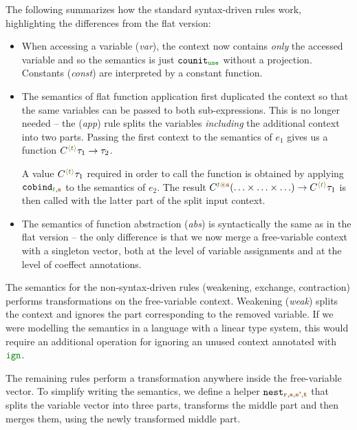 The following summarizes how the standard syntax-driven rules work, highlighting the differences
from the flat version:

\begin{itemize}
\item When accessing a variable (\emph{var}), the context now contains \emph{only} the accessed
  variable and so the semantics is just $\ident{counit}_{\cunit}$ without a projection.
  Constants (\emph{const}) are interpreted by a constant function.

\item The semantics of flat function application first duplicated the context so that the same
  variables can be passed to both sub-expressions. This is no longer needed -- the
  (\emph{app}) rule splits the variables \emph{including} the additional context into two parts.
  Passing the first context to the semantics of $e_1$ gives us a function
  $\ctyp{\alift{\cclrd{t}}}{\tau_1} \rightarrow \tau_2$.

  A value $\ctyp{\alift{\cclrd{t}}}{\tau_1}$ required in order to call the function is obtained by
  applying $\ident{cobind}_{\cclrd{t}, \aclrd{\textbf{s}}}$ to the semantics of $e_2$. The result
  $\ctyp{\cclrd{t}\aseq\aclrd{\textbf{s}}}{(\ldots \times \ldots \times \ldots)} \rightarrow \ctyp{\alift{\cclrd{t}}}{\tau_1}$
  is then called with the latter part of the split input context.

\item The semantics of function abstraction (\emph{abs}) is syntactically the same as in the
  flat version -- the only difference is that we now merge a free-variable context with a
  singleton vector, both at the level of variable assignments and at the level of coeffect
  annotations.
\end{itemize}

\noindent
The semantics for the non-syntax-driven rules (weakening, exchange, contraction) performs
transformations on the free-variable context. Weakening (\emph{weak}) splits the context and
ignores the part corresponding to the removed variable. If we were modelling the semantics in
a language with a linear type system, this would require an additional operation for ignoring an
unused context annotated with $\aclrd{\czero}$.

The remaining rules perform a transformation anywhere inside the free-variable vector.
To simplify writing the semantics, we define a helper
$\ident{nest}_{\aclrd{\textbf{r}}, \aclrd{\textbf{s}}, \aclrd{\textbf{s'}}, \aclrd{\textbf{t}}}$
that splits the variable vector into three parts, transforms the middle part and then
merges them, using the newly transformed middle part.

